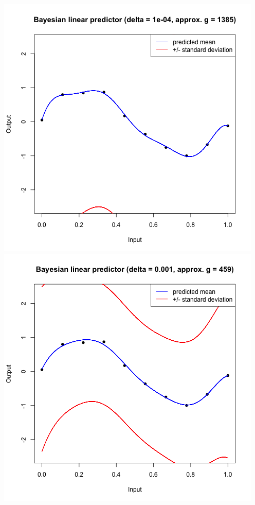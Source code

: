 \documentclass[a4paper, 11pt]{article}
\begin{document}
\begin{center}
\includegraphics[scale=0.6]{ps3F_plot3_1.png}
\includegraphics[scale=0.6]{ps3F_plot3_2.png}

\end{center}
\end{document}
